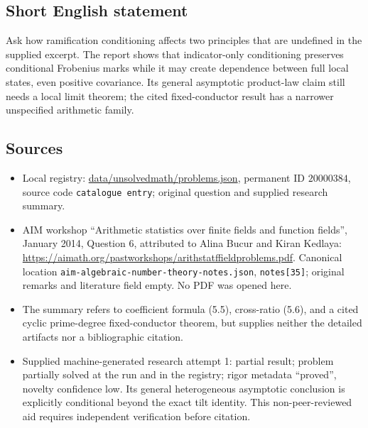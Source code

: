 \documentclass[11pt]{article}
\begin{document}
\subsection{Short English statement}
Ask how ramification conditioning affects two principles that are undefined in the supplied excerpt. The report shows that indicator-only conditioning preserves conditional Frobenius marks while it may create dependence between full local states, even positive covariance. Its general asymptotic product-law claim still needs a local limit theorem; the cited fixed-conductor result has a narrower unspecified arithmetic family.
\subsection{Sources}
\begin{itemize}
\item Local registry: \url{data/unsolvedmath/problems.json}, permanent ID $20000384$, source code \texttt{catalogue entry}; original question and supplied research summary.
\item AIM workshop ``Arithmetic statistics over finite fields and function fields'', January 2014, Question 6, attributed to Alina Bucur and Kiran Kedlaya: \url{https://aimath.org/pastworkshops/arithstatffieldproblems.pdf}. Canonical location \texttt{aim-algebraic-number-theory-notes.json}, \texttt{notes[35]}; original remarks and literature field empty. No PDF was opened here.
\item The summary refers to coefficient formula (5.5), cross-ratio (5.6), and a cited cyclic prime-degree fixed-conductor theorem, but supplies neither the detailed artifacts nor a bibliographic citation.
\item Supplied machine-generated research attempt 1: partial result; problem partially solved at the run and in the registry; rigor metadata ``proved'', novelty confidence low. Its general heterogeneous asymptotic conclusion is explicitly conditional beyond the exact tilt identity. This non-peer-reviewed aid requires independent verification before citation.
\end{itemize}
\end{document}
